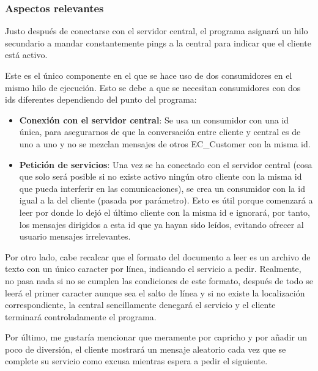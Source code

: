 \documentclass[a4paper,12pt]{article}
\begin{document}
\subsubsection{Aspectos relevantes}
Justo después de conectarse con el servidor central, el programa asignará un hilo secundario a mandar constantemente pings a la central
para indicar que el cliente está activo. \par

Este es el único componente en el que se hace uso de dos consumidores en el mismo hilo de ejecución. Esto se debe a que se necesitan
consumidores con dos ids diferentes dependiendo del punto del programa:
\begin{itemize}
  \item \textbf{Conexión con el servidor central}: Se usa un consumidor con una id única, para asegurarnos de que la conversación
        entre cliente y central es de uno a uno y no se mezclan mensajes de otros EC\_Customer con la misma id.
  \item \textbf{Petición de servicios}: Una vez se ha conectado con el servidor central (cosa que solo será posible si no existe activo
        ningún otro cliente con la misma id que pueda interferir en las comunicaciones), se crea un consumidor con la id igual a la del cliente
        (pasada por parámetro). Esto es útil porque comenzará a leer por donde lo dejó el último cliente con la misma id e ignorará, por
        tanto, los mensajes dirigidos a esta id que ya hayan sido leídos, evitando ofrecer al usuario mensajes irrelevantes. \par
\end{itemize}

Por otro lado, cabe recalcar que el formato del documento a leer es un archivo de texto con un único caracter por línea, indicando el servicio a pedir.
Realmente, no pasa nada si no se cumplen las condiciones de este formato, después de todo se leerá el primer caracter aunque sea el salto de línea
y si no existe la localización correspondiente, la central sencillamente denegará el servicio y el cliente terminará controladamente el programa. \par

Por último, me gustaría mencionar que meramente por capricho y por añadir un poco de diversión, el cliente mostrará un mensaje aleatorio
cada vez que se complete su servicio como excusa mientras espera a pedir el siguiente.
\end{document}
